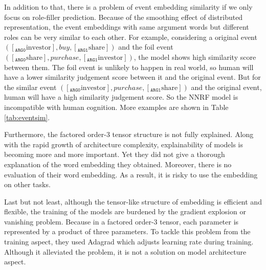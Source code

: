 \documentclass[a4paper]{article}
\begin{document}
In addition to that, there is a problem of event embedding similarity if we only focus on role-filler prediction. Because of the smoothing effect of distributed representation, the event embeddings with same argument words but different roles can be very similar to each other. For example, considering a original event $([_{\texttt{ARG0}} \text{investor}], buy, [_{\texttt{ARG1}}\text{share}])$ and the foil event $([_{\texttt{ARG0}}\text{share}], purchase, [_{\texttt{ARG1}}\text{investor}])$, the model shows high similarity score between them. The foil event is unlikely to happen in real world, so human will have a lower similarity judgement score between it and the original event. But for the similar event $([_{\texttt{ARG0}}\text{investor}], purchase, [_{\texttt{ARG1}}\text{share}])$ and the original event, human will have a high similarity judgement score. So the NNRF model is incompatible with human cognition. More examples are shown in Table \ref{tab:eventsim}. 
% 
% 
% 
%

Furthermore, the factored order-3 tensor structure is not fully explained. Along with the rapid growth of architecture complexity, explainability of models is becoming more and more important. Yet they did not give a thorough explanation of the word embedding they obtained. Moreover, there is no evaluation of their word embedding. As a result, it is risky to use the embedding on other tasks. 

Last but not least, although the tensor-like structure of embedding is efficient and flexible, the training of the models are burdened by the gradient explosion or vanishing problem. Because in a factored order-3 tensor, each parameter is represented by a product of three parameters. To tackle this problem from the training aspect, they used Adagrad \citep{duchi2011adaptive} which adjusts learning rate during training. Although it alleviated the problem, it is not a solution on model architecture aspect. 
\end{document}
